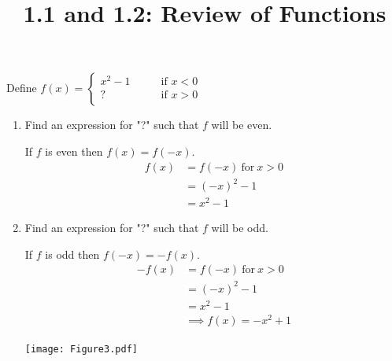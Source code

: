 \documentclass[nooutcomes, noinstructornotes]{ximera}
\title{1.1 and 1.2:  Review of Functions}
\begin{document}
\begin{abstract}		\end{abstract}
\maketitle






\begin{problem}
Define 
	$f(x) =   \left\{ \begin{array}{cl}
	x^2-1		 	&	\qquad \text{if } x < 0					\\
	\text{? }			&	\qquad \text{if }  x > 0 	\\		\end{array} \right.  $
\begin{enumerate}	
	\item  Find an expression for "?" such that $f$ will be even.
	
	\begin{freeResponse} 
			If $f$ is even then $f(x)=f(-x)$.  
			\begin{align*}
			f(x)&=f(-x)\ \text{for}\ x>0\\
			&=(-x)^2-1\\
			&=x^2-1	
			\end{align*}
	\end{freeResponse}
	
	\item  Find an expression for "?" such that $f$ will be odd.
	
	\begin{freeResponse}
	   If $f$ is odd then $f(-x)=-f(x)$. 
			\begin{align*}
			-f(x)&=f(-x)\ \text{for}\ x>0\\
			&=(-x)^2-1\\
			&=x^2-1\\
			& \implies f(x)=-x^2+1	
			\end{align*}
	
	\begin{image}		
	\texttt{[image: Figure3.pdf]}
	\end{image}
		

	\end{freeResponse}


	\end{enumerate}
	
	
	
	
\end{problem}

\begin{instructorNotes}

\end{instructorNotes}
\end{document}
